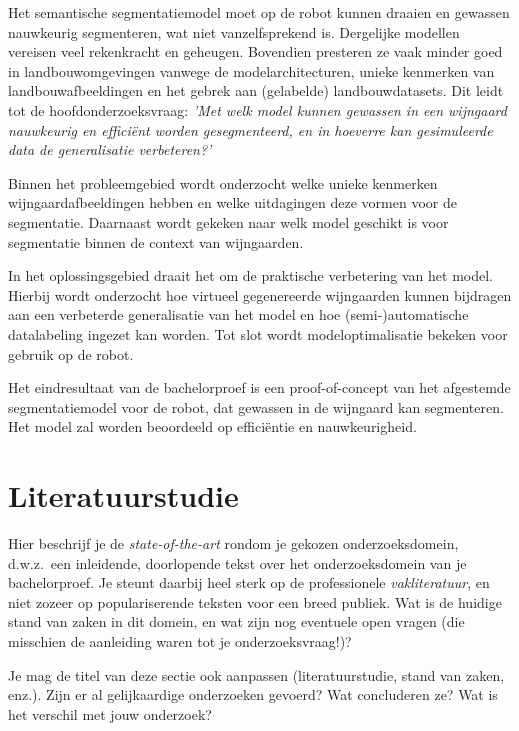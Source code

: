 Het semantische segmentatiemodel moet op de robot kunnen draaien en gewassen nauwkeurig segmenteren, wat niet vanzelfsprekend is. Dergelijke modellen vereisen veel rekenkracht en geheugen. Bovendien presteren ze vaak minder goed in landbouwomgevingen vanwege de modelarchitecturen, unieke kenmerken van landbouwafbeeldingen en het gebrek aan (gelabelde) landbouwdatasets. Dit leidt tot de hoofdonderzoeksvraag: \textit{'Met welk model kunnen gewassen in een wijngaard nauwkeurig en efficiënt worden gesegmenteerd, en in hoeverre kan gesimuleerde data de generalisatie verbeteren?'}

Binnen het probleemgebied wordt onderzocht welke unieke kenmerken wijngaardafbeeldingen hebben en welke uitdagingen deze vormen voor de segmentatie. Daarnaast wordt gekeken naar welk model geschikt is voor segmentatie binnen de context van wijngaarden.

In het oplossingsgebied draait het om de praktische verbetering van het model. Hierbij wordt onderzocht hoe virtueel gegenereerde wijngaarden kunnen bijdragen aan een verbeterde generalisatie van het model en hoe (semi-)automatische datalabeling ingezet kan worden.  Tot slot wordt modeloptimalisatie bekeken voor gebruik op de robot.

Het eindresultaat van de bachelorproef is een proof-of-concept van het afgestemde segmentatiemodel voor de robot, dat gewassen in de wijngaard kan segmenteren. Het model zal worden beoordeeld op efficiëntie en nauwkeurigheid.


\section{Literatuurstudie}%
\label{sec:literatuurstudie}

Hier beschrijf je de \emph{state-of-the-art} rondom je gekozen onderzoeksdomein, d.w.z.\ een inleidende, doorlopende tekst over het onderzoeksdomein van je bachelorproef. Je steunt daarbij heel sterk op de professionele \emph{vakliteratuur}, en niet zozeer op populariserende teksten voor een breed publiek. Wat is de huidige stand van zaken in dit domein, en wat zijn nog eventuele open vragen (die misschien de aanleiding waren tot je onderzoeksvraag!)?

Je mag de titel van deze sectie ook aanpassen (literatuurstudie, stand van zaken, enz.). Zijn er al gelijkaardige onderzoeken gevoerd? Wat concluderen ze? Wat is het verschil met jouw onderzoek?

